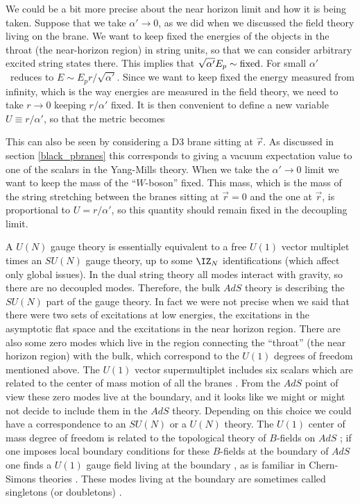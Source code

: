 We could be a bit more precise about the near horizon limit and 
how it is being taken. Suppose that we take $\alpha' \to  0$, as 
we did when we discussed the field theory living on the brane. 
We want to keep fixed the energies of the objects in the throat 
(the near-horizon region) in string units,
so that we can consider arbitrary excited
string states there. This implies that
 $\sqrt{\alpha'} E_p \sim {\rm fixed} $. 
For small $\alpha'$  \redshift\  reduces to 
$E \sim E_p r/\sqrt{\alpha'} $. Since we want to keep 
fixed the energy measured from infinity, which is  the
way energies are measured in the field theory, we need to take 
$r \to 0$ keeping $r / \alpha' $ fixed.  
It is then convenient to define a new variable $U \equiv r / \alpha'$, so
that the metric becomes

This can also be seen by considering a D3 brane sitting at $\vec r$. 
As discussed in section \ref{black_pbranes} this corresponds to 
giving a vacuum expectation value to one of the scalars in the 
Yang-Mills theory. When we take the $\alpha' \to 0$ limit we want
to keep the mass of the ``$W$-boson'' fixed. This mass, which is the
mass of the string stretching between the branes sitting at 
$\vec r =0$ and the one at $\vec r$, is proportional to $  U = 
r/\alpha'$, 
so this quantity should remain fixed in the decoupling limit. 

A $U(N)$ gauge theory is essentially equivalent to a free $U(1)$
vector multiplet times an $SU(N)$ gauge theory, up to some $\IZ_N$
identifications (which affect only global issues).  In the dual string
theory all modes interact with gravity, so there are no decoupled
modes. Therefore, the bulk $AdS$ theory is describing the $SU(N)$ part
of the gauge theory.  In fact we were not precise when we said that
there were two sets of excitations at low energies, the excitations in
the asymptotic flat space and the excitations in the near horizon
region. There are also some zero modes which live in the region
connecting the ``throat'' (the near horizon region) 
with the bulk, which correspond to the $U(1)$
degrees of freedom mentioned above. The $U(1)$ vector supermultiplet
includes six scalars which are related to the center of mass motion of
all the branes
\cite{Gibbons:1993sv}.  From the $AdS$ point of view these zero 
modes live
at the boundary, and it looks like we might or might not decide to
include them in the $AdS$ theory. Depending on this choice we could have
a correspondence to an $SU(N)$ or a $U(N)$ theory. 
The $U(1)$ center of mass degree of freedom
is related to the topological theory of $B$-fields on $AdS$ 
\cite{Witten:1998wy}; if one imposes local boundary conditions for
these $B$-fields at the boundary of $AdS$ one finds a $U(1)$ gauge 
field living at the boundary \cite{seibergprivate},
 as is familiar in Chern-Simons theories
\cite{Witten:1989hf,Elitzur:1989nr}.
These modes living
at the boundary are sometimes called singletons (or doubletons) 
\cite{Fronsdal:1982gq,Freedman:1984na,Pilch:1984xy,Gunaydin:1985wc,%
Gunaydin:1986tc,Gunaydin:1986cs,Bergshoeff:1988jm,Bergshoeff:1988jx,%
Bergshoeff:1989uc}.

